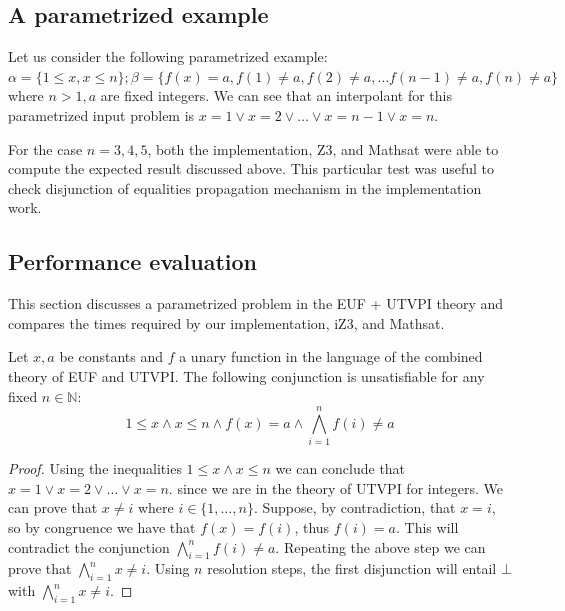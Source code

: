 \subsection{A parametrized example}

Let us consider the following parametrized 
example: $\alpha = \{1 \leq x, x \leq n \}; \beta = \{f(x) = a, 
  f(1) \neq a,
  f(2) \neq a, \dots
  f(n-1) \neq a,
f(n) \neq a\}$ where $n > 1, a$ are fixed integers. We can see that an 
interpolant for this parametrized input problem is 
$x = 1 \lor x = 2 \lor \dots \lor x = n-1 \lor x = n$.

For the case $n = 3, 4, 5$, both the implementation, Z3, and Mathsat were able
to compute the expected result discussed above. This particular test
was useful to check disjunction of equalities propagation mechanism in the
implementation work.

\subsection{Performance evaluation} \label{performance_thcomb}

This section discusses a parametrized problem 
in the EUF + UTVPI theory and compares the times required by
our implementation, iZ3, and Mathsat.

\begin{lemma} \label{performance_test_lemma_thcomb}
  Let $x, a$ be constants and $f$ a unary function 
  in the language of the combined theory of EUF and UTVPI.
  The following conjunction is unsatisfiable for any
  fixed $n \in \mathbb{N}$:
  \begin{equation*}
    1 \leq x \land x \leq n 
    \land f(x) = a 
    \land \bigwedge_{i=1}^{n} f(i) \neq a
  \end{equation*}
\end{lemma}

\begin{proof}
  Using the inequalities $1 \leq x \land x \leq n$
  we can conclude that $x = 1 \lor x = 2 \lor \dots \lor x = n$.
  since we are in the theory of UTVPI for integers.
  We can prove that $x \neq i$ where $i \in \{1, \dots, n \}$.
  Suppose, by contradiction, that $x = i$, so by congruence
  we have that $f(x) = f(i)$, thus $f(i) = a$. This will 
  contradict the conjunction $\bigwedge_{i=1}^{n} f(i) \neq a$.
  Repeating the above step we can prove that 
  $\bigwedge_{i=1}^n x \neq i$. Using $n$ resolution steps, 
  the first disjunction will entail $\bot$ with 
  $\bigwedge_{i=1}^{n} x \neq i$.
\end{proof}

